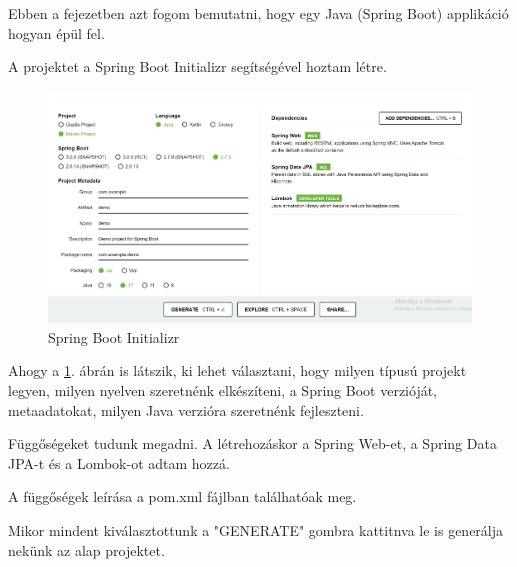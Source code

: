 
Ebben a fejezetben azt fogom bemutatni, hogy egy Java (Spring Boot) applikáció hogyan épül fel.

A projektet a Spring Boot Initializr segítségével hoztam létre.

\begin{figure}[h]
\centering
\includegraphics[scale=0.37]{images/Spring_init.png}
\caption{Spring Boot Initializr\cite{SpringInit}}
\label{fig:Spring_Boot_Initializr}
\end{figure}

Ahogy a \ref{fig:Spring_Boot_Initializr}. ábrán is látszik, ki lehet választani, hogy milyen típusú projekt legyen, milyen nyelven szeretnénk elkészíteni, a Spring Boot verzióját, metaadatokat, milyen Java verzióra szeretnénk fejleszteni.

Függőségeket tudunk megadni. A létrehozáskor a Spring Web-et, a Spring Data JPA-t és a Lombok-ot adtam hozzá.

A függőségek leírása a pom.xml fájlban találhatóak meg. 

Mikor mindent kiválasztottunk a "GENERATE" gombra kattitnva le is generálja nekünk az alap projektet.
\newpage

